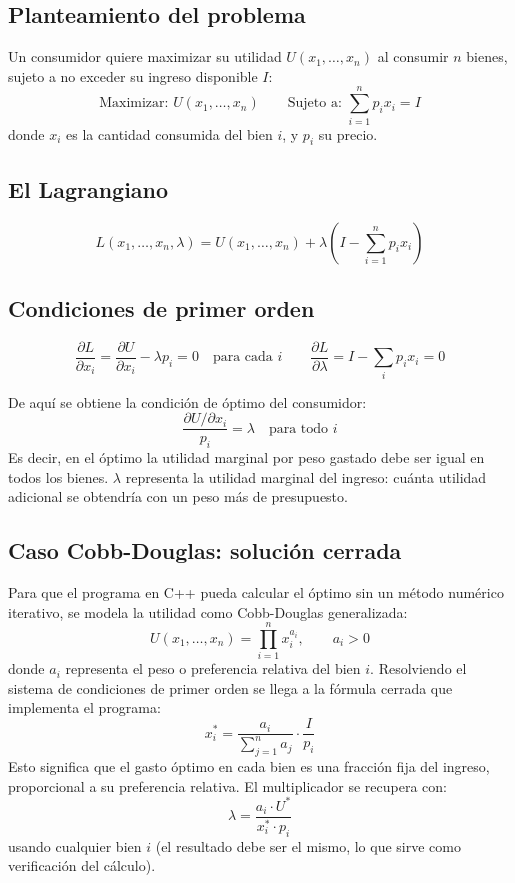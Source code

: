 \documentclass[12pt,letterpaper]{article}
\begin{document}
\subsection{Planteamiento del problema}

Un consumidor quiere maximizar su utilidad $U(x_1,\dots,x_n)$ al consumir $n$ bienes, sujeto a no exceder su ingreso disponible $I$:
\[
\text{Maximizar: } U(x_1,\dots,x_n) \qquad
\text{Sujeto a: } \sum_{i=1}^{n} p_i x_i = I
\]
donde $x_i$ es la cantidad consumida del bien $i$, y $p_i$ su precio.

\subsection{El Lagrangiano}

\[
L(x_1,\dots,x_n,\lambda) = U(x_1,\dots,x_n) + \lambda\left(I - \sum_{i=1}^n p_i x_i\right)
\]

\subsection{Condiciones de primer orden}

\[
\frac{\partial L}{\partial x_i} = \frac{\partial U}{\partial x_i} - \lambda p_i = 0 \quad \text{para cada } i
\qquad
\frac{\partial L}{\partial \lambda} = I - \sum_i p_i x_i = 0
\]

De aquí se obtiene la condición de óptimo del consumidor:
\[
\frac{\partial U / \partial x_i}{p_i} = \lambda \quad \text{para todo } i
\]
Es decir, en el óptimo la utilidad marginal por peso gastado debe ser igual en todos los bienes. $\lambda$ representa la utilidad marginal del ingreso: cuánta utilidad adicional se obtendría con un peso más de presupuesto.

\subsection{Caso Cobb-Douglas: solución cerrada}

Para que el programa en C++ pueda calcular el óptimo sin un método numérico iterativo, se modela la utilidad como Cobb-Douglas generalizada:
\[
U(x_1,\dots,x_n) = \prod_{i=1}^{n} x_i^{a_i}, \qquad a_i > 0
\]
donde $a_i$ representa el peso o preferencia relativa del bien $i$. Resolviendo el sistema de condiciones de primer orden se llega a la fórmula cerrada que implementa el programa:
\[
\boxed{x_i^{*} = \dfrac{a_i}{\sum_{j=1}^n a_j} \cdot \dfrac{I}{p_i}}
\]
Esto significa que el gasto óptimo en cada bien es una fracción fija del ingreso, proporcional a su preferencia relativa. El multiplicador se recupera con:
\[
\lambda = \frac{a_i \cdot U^{*}}{x_i^{*} \cdot p_i}
\]
usando cualquier bien $i$ (el resultado debe ser el mismo, lo que sirve como verificación del cálculo).
\end{document}
